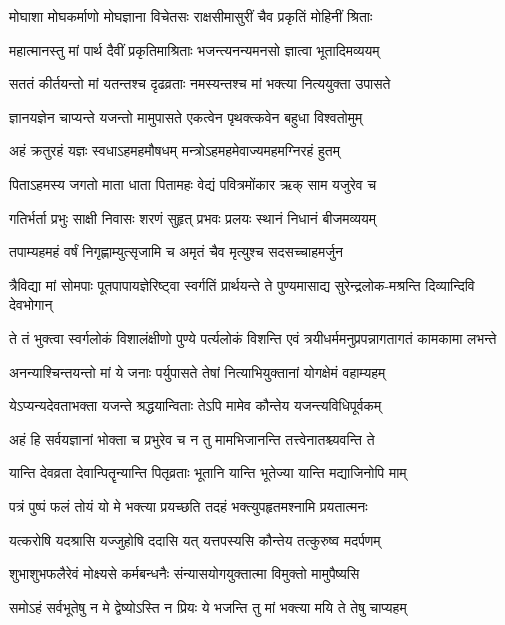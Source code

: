 \twolineshloka
{मोघाशा मोघकर्माणो मोघज्ञाना विचेतसः}
{राक्षसीमासुरीं चैव प्रकृतिं मोहिनीं श्रिताः}


\twolineshloka
{महात्मानस्तु मां पार्थ दैवीं प्रकृतिमाश्रिताः}
{भजन्त्यनन्यमनसो ज्ञात्वा भूतादिमव्ययम्}


\twolineshloka
{सततं कीर्तयन्तो मां यतन्तश्च दृढव्रताः}
{नमस्यन्तश्च मां भक्त्या नित्ययुक्ता उपासते}


\twolineshloka
{ज्ञानयज्ञेन चाप्यन्ते यजन्तो मामुपासते}
{एकत्वेन पृथक्त्कवेन बहुधा विश्वतोमुम्}


\twolineshloka
{अहं क्रतुरहं यज्ञः स्वधाऽहमहमौषधम्}
{मन्त्रोऽहमहमेवाज्यमहमग्निरहं हुतम्}


\twolineshloka
{पिताऽहमस्य जगतो माता धाता पितामहः}
{वेद्यं पवित्रमोंकार ऋक् साम यजुरेव च}


\twolineshloka
{गतिर्भर्ता प्रभुः साक्षी निवासः शरणं सुहृत्}
{प्रभवः प्रलयः स्थानं निधानं बीजमव्ययम्}


\twolineshloka
{तपाम्यहमहं वर्षं निगृह्णाम्युत्सृजामि च}
{अमृतं चैव मृत्युश्च सदसच्चाहमर्जुन}


\twolineshloka
{त्रैविद्या मां सोमपाः पूतपापायज्ञेरिष्ट्वा स्वर्गतिं प्रार्थयन्ते}
{ते पुण्यमासाद्य सुरेन्द्रलोक-मश्रन्ति दिव्यान्दिवि देवभोगान्}


\twolineshloka
{ते तं भुक्त्वा स्वर्गलोकं विशालंक्षीणो पुण्ये पर्त्यलोकं विशन्ति}
{एवं त्रयीधर्ममनुप्रपन्नागतागतं कामकामा लभन्ते}


\twolineshloka
{अनन्याश्चिन्तयन्तो मां ये जनाः पर्युपासते}
{तेषां नित्याभियुक्तानां योगक्षेमं वहाम्यहम्}


\twolineshloka
{येऽप्यन्यदेवताभक्ता यजन्ते श्रद्धयान्विताः}
{तेऽपि मामेव कौन्तेय यजन्त्यविधिपूर्वकम्}


\twolineshloka
{अहं हि सर्वयज्ञानां भोक्ता च प्रभुरेव च}
{न तु मामभिजानन्ति तत्त्वेनातश्च्यवन्ति ते}


\twolineshloka
{यान्ति देवव्रता देवान्पितॄन्यान्ति पितृव्रताः}
{भूतानि यान्ति भूतेज्या यान्ति मद्याजिनोपि माम्}


\twolineshloka
{पत्रं पुष्पं फलं तोयं यो मे भक्त्या प्रयच्छति}
{तदहं भक्त्युपहृतमश्नामि प्रयतात्मनः}


\twolineshloka
{यत्करोषि यदश्रासि यज्जुहोषि ददासि यत्}
{यत्तपस्यसि कौन्तेय तत्कुरुष्व मदर्पणम्}


\twolineshloka
{शुभाशुभफलैरेवं मोक्ष्यसे कर्मबन्धनैः}
{संन्यासयोगयुक्तात्मा विमुक्तो मामुपैष्यसि}


\twolineshloka
{समोऽहं सर्वभूतेषु न मे द्वेष्योऽस्ति न प्रियः}
{ये भजन्ति तु मां भक्त्या मयि ते तेषु चाप्यहम्}


